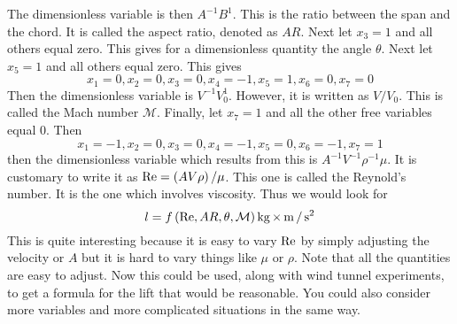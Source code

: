 The dimensionless variable is then $A^{-1}B^{1}$. This is the ratio between
the span and the chord. It is called the aspect ratio, denoted as $AR$. Next
let $x_{3}=1$ and all others equal zero. This gives for a dimensionless
quantity the angle $\theta $. Next let $x_{5}=1$ and all others equal zero.
This gives
\begin{equation*}
x_{1}=0,x_{2}=0,x_{3}=0,x_{4}=-1,x_{5}=1,x_{6}=0,x_{7}=0
\end{equation*}
Then the dimensionless variable is $V^{-1}V_{0}^{1}.$ However, it is written
as $V/V_{0}$. This is called the Mach number $\mathcal{M}$. Finally, let 
$x_{7}=1$ and all the other free variables equal 0. Then 
\begin{equation*}
x_{1}=-1,x_{2}=0,x_{3}=0,x_{4}=-1,x_{5}=0,x_{6}=-1,x_{7}=1
\end{equation*}
then the dimensionless variable which results from this is $A^{-1}V^{-1}\rho
^{-1}\mu .$ It is customary to write it as $\mbox{Re}=\left( AV\rho \right)
/\mu $. This one is called the Reynold's number. It is the one which
involves viscosity. Thus we would look for 
\begin{equation*}
l=f\left( \mbox{Re},AR,\theta ,\mathcal{M}\right) \mathop{\textrm{\rm kg}}\nolimits\times \mathop{\textrm{\rm m}}\nolimits/\mathop{\textrm{\rm s}}\nolimits ^{2}
\end{equation*}
This is quite interesting because it is easy to vary $\mbox{Re}$ by simply
adjusting the velocity or $A$ but it is hard to vary things like $\mu $ or $%
\rho $. Note that all the quantities are easy to adjust. Now this could be
used, along with wind tunnel experiments, to get a formula for the lift that
would be reasonable. You could also consider more variables and more
complicated situations in the same way.

